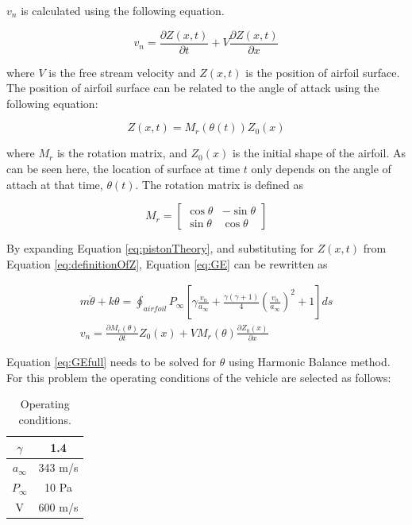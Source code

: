 \documentclass[12pt, a4paper]{extarticle}
\begin{document}
$v_n$ is calculated using the following equation.

\begin{equation}\label{eq:definitionOfVn}
	v_n = \frac{\partial Z(x,t)}{\partial t} + V \frac{\partial Z(x,t)}{\partial x}
\end{equation}

where $V$ is the free stream velocity and $Z(x,t)$ is the position of airfoil surface. The position of airfoil surface can be related to the angle of attack using the following equation:

\begin{equation}\label{eq:definitionOfZ}
	Z(x,t) = M_r\left( \theta(t) \right) Z_0(x)
\end{equation}

where $M_r$ is the rotation matrix, and $Z_0(x)$ is the initial shape of the airfoil.  As can be seen here, the location of surface at time $t$ only depends on the angle of attach at that time, $\theta(t)$. The rotation matrix is defined as

\begin{equation*}
	M_r = 
	\begin{bmatrix}
		\cos \theta & -\sin \theta \\
		\sin \theta & \cos \theta
	\end{bmatrix}
\end{equation*}

By expanding Equation \eqref{eq:pistonTheory}, and substituting for $Z(x,t)$ from Equation \eqref{eq:definitionOfZ}, Equation \eqref{eq:GE} can be rewritten as

\begin{subequations}
\begin{gather}
	m\ddot{\theta} + k \theta = 
	\oint_{airfoil} P_\infty
	\left[
	\gamma \frac{v_n}{a_\infty} +
	\frac{\gamma (\gamma + 1)}{4} \left( \frac{v_n}{a_\infty}\right)^2 +
	1
	\right] ds
	\\
	v_n = 
	\frac{\partial M_r(\theta)}{\partial t}Z_0(x) + V M_r(\theta)\frac{\partial Z_0(x)}{\partial x}
\end{gather}\label{eq:GEfull}
\end{subequations}

Equation \eqref{eq:GEfull} needs to be solved for $\theta$ using Harmonic Balance method. For this problem the operating conditions of the vehicle are selected as follows:

\begin{table}[htbp]
\begin{center}
\begin{tabular}{c|c}
	$\gamma$ & 1.4 \\ \hline
	$a_\infty$ & 343 m/s \\ \hline
	$P_\infty$ & 10 Pa \\ \hline
	V & 600 m/s \\
	\end{tabular}
	\end{center}
	\caption{Operating conditions.}
\end{table}
\end{document}
